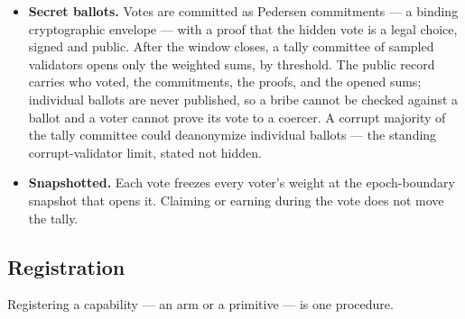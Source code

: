 \documentclass[11pt]{article}
\begin{document}
\begin{itemize}
with $d$ at least three and scaling with the sampled set. One
owner holding several identities must therefore hold weight
across several genuinely distinct serving businesses to move any
vote; weight that is all one identity never ratifies, whatever
its size.
\item \textbf{Secret ballots.} Votes are committed as Pedersen
commitments --- a binding cryptographic envelope --- with a
proof that the hidden vote is a legal choice, signed and
public. After the window closes, a tally committee of sampled
validators opens only the weighted sums, by threshold. The
public record carries who voted, the commitments, the proofs,
and the opened sums; individual ballots are never published, so
a bribe cannot be checked against a ballot and a voter cannot
prove its vote to a coercer. A corrupt majority of the tally
committee could deanonymize individual ballots --- the standing
corrupt-validator limit, stated not hidden.
\item \textbf{Snapshotted.} Each vote freezes every voter's
weight at the epoch-boundary snapshot that opens it. Claiming
or earning during the vote does not move the tally.
\end{itemize}

\subsection{Registration}

Registering a capability --- an arm or a primitive --- is one
procedure.
\end{document}

